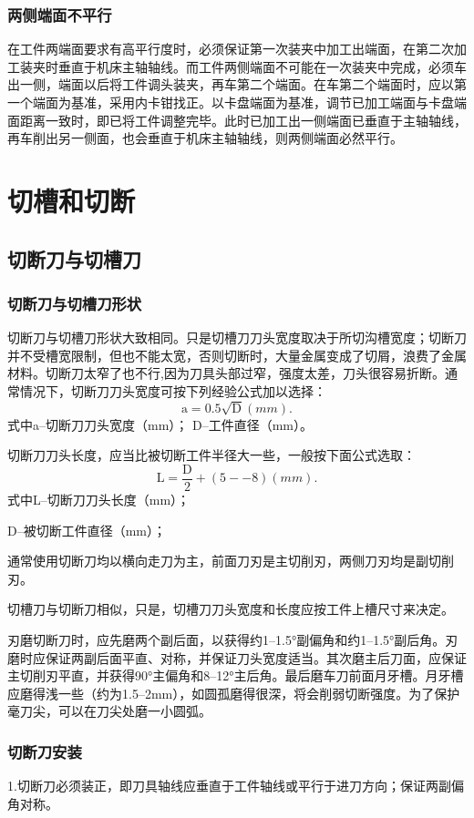 \documentclass{ctexbook}
\begin{document}
\subsubsection{两侧端面不平行}
在工件两端面要求有高平行度时，必须保证第一次装夹中加工出端面，在第二次加工装夹时垂直于机床主轴轴线。而工件两侧端面不可能在一次装夹中完成，必须车出一侧，端面以后将工件调头装夹，再车第二个端面。在车第二个端面时，应以第一个端面为基准，采用内卡钳找正。以卡盘端面为基准，调节已加工端面与卡盘端面距离一致时，即已将工件调整完毕。此时已加工出一侧端面已垂直于主轴轴线，再车削出另一侧面，也会垂直于机床主轴轴线，则两侧端面必然平行。
\section{切槽和切断}
\subsection{切断刀与切槽刀}
\subsubsection{切断刀与切槽刀形状}
切断刀与切槽刀形状大致相同。只是切槽刀刀头宽度取决于所切沟槽宽度；切断刀并不受槽宽限制，但也不能太宽，否则切断时，大量金属变成了切屑，浪费了金属材料。切断刀太窄了也不行,因为刀具头部过窄，强度太差，刀头很容易折断。通常情况下，切断刀刀头宽度可按下列经验公式加以选择：
\begin{equation*}
	\text{a}=0.5\sqrt{\text{D}} (mm).
\end{equation*}
式中a--切断刀刀头宽度（mm）；
D--工件直径（mm）。

切断刀刀头长度，应当比被切断工件半径大一些，一般按下面公式选取：
\begin{equation*}
	\text{L}=\frac{\text{D}}{2}+(5--8) (mm) .
\end{equation*}
式中L--切断刀刀头长度（mm）；

D--被切断工件直径（mm）；

通常使用切断刀均以横向走刀为主，前面刀刃是主切削刃，两侧刀刃均是副切削刃。

切槽刀与切断刀相似，只是，切槽刀刀头宽度和长度应按工件上槽尺寸来决定。

刃磨切断刀时，应先磨两个副后面，以获得约1--1.5°副偏角和约1--1.5°副后角。刃磨时应保证两副后面平直、对称，并保证刀头宽度适当。其次磨主后刀面，应保证主切削刃平直，并获得90°主偏角和8--12°主后角。最后磨车刀前面月牙槽。月牙槽应磨得浅一些（约为1.5--2mm），如圆孤磨得很深，将会削弱切断强度。为了保护毫刀尖，可以在刀尖处磨一小圆弧。
\subsubsection{切断刀安装}
1.切断刀必须装正，即刀具轴线应垂直于工件轴线或平行于进刀方向；保证两副偏角对称。
\end{document}
